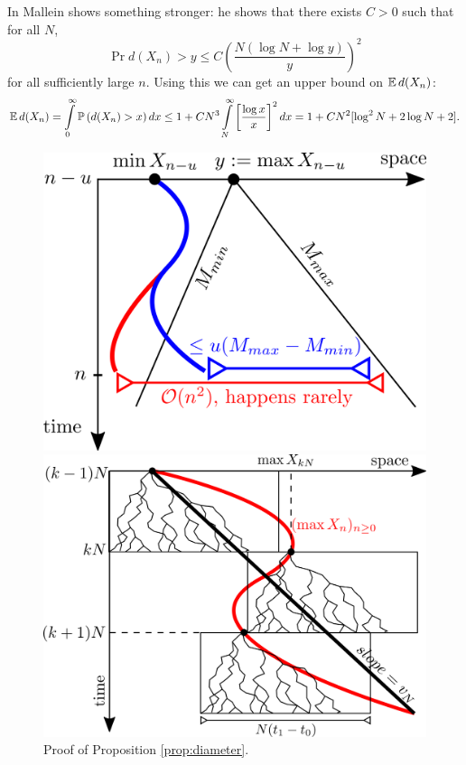 \begin{remark}
In \cite{mallein2018n} Mallein shows something stronger: he shows that there exists $C > 0$ such that for all $N$, 
\begin{equation}\nonumber
\Pr{d(X_n) > y} \leq C \left( \frac{N(\log N + \log y)}{y}\right)^2
\end{equation}
for all sufficiently large $n$. Using this we can get an upper bound on $\mathbb{E}\, d(X_n)$:
\begin{equation}\nonumber
\mathbb{E}\, d(X_n) = \int\limits_0^\infty \mathbb{P} \left( d(X_n) > x \right) dx \leq 1 + C N^3 \int\limits^\infty_N \left[\frac{\log x}{x}\right]^2 dx = 1 + C N^2[ \log^2 N + 2 \log N + 2]. 
\end{equation}
\end{remark}

\begin{figure}[!h]
\centering
\begin{minipage}{0.45\textwidth}
  \centering
  \includegraphics{graphics/g2}
  \caption{Proof of Proposition \ref{prop:diameter}. }
  \label{fig:diam_proof}
\end{minipage}\hfill%
\begin{minipage}{0.45\textwidth}
  \centering
  \includegraphics{graphics/g1}

\end{minipage}
\end{figure}

